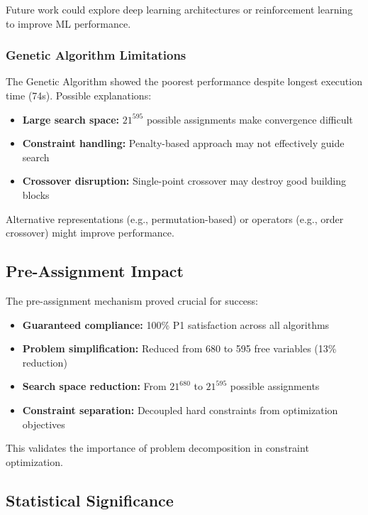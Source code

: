 \documentclass[algorithms,article,submit,pdftex,moreauthors]{Definitions/mdpi}
\begin{document}
Future work could explore deep learning architectures or reinforcement learning to improve ML performance.

\subsubsection{Genetic Algorithm Limitations}

The Genetic Algorithm showed the poorest performance despite longest execution time (74s). Possible explanations:

\begin{itemize}
\item \textbf{Large search space:} $21^{595}$ possible assignments make convergence difficult
\item \textbf{Constraint handling:} Penalty-based approach may not effectively guide search
\item \textbf{Crossover disruption:} Single-point crossover may destroy good building blocks
\end{itemize}

Alternative representations (e.g., permutation-based) or operators (e.g., order crossover) might improve performance.

\subsection{Pre-Assignment Impact}

The pre-assignment mechanism proved crucial for success:

\begin{itemize}
\item \textbf{Guaranteed compliance:} 100\% P1 satisfaction across all algorithms
\item \textbf{Problem simplification:} Reduced from 680 to 595 free variables (13\% reduction)
\item \textbf{Search space reduction:} From $21^{680}$ to $21^{595}$ possible assignments
\item \textbf{Constraint separation:} Decoupled hard constraints from optimization objectives
\end{itemize}

This validates the importance of problem decomposition in constraint optimization.

\subsection{Statistical Significance}
\end{document}
